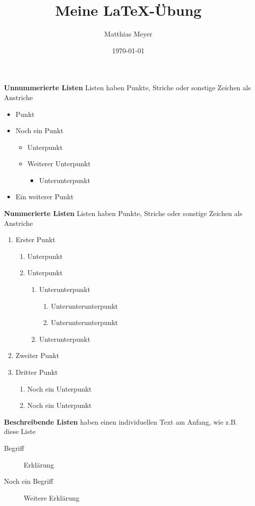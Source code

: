 \documentclass[a4paper,twoside,10pt]{article}
\author{Matthias Meyer}
\title{Meine LaTeX-Übung}
\date{\today}
\begin{document}
\textbf{Unnummerierte Listen} Listen haben Punkte, Striche oder sonstige Zeichen als Anstriche
 \begin{itemize}
    \item Punkt
    \item Noch ein Punkt
    \begin{itemize}
        \item Unterpunkt
        \item Weiterer Unterpunkt
        \begin{itemize}
            \item Unterunterpunkt
        \end{itemize}        
    \end{itemize}
    \item Ein weiterer Punkt
 \end{itemize}

 \textbf{Nummerierte Listen} Listen haben Punkte, Striche oder sonstige Zeichen als Anstriche

 \begin{enumerate}
     \item Erster Punkt
     \begin{enumerate}
         \item Unterpunkt
         \item Unterpunkt
         \begin{enumerate}
            \item Unterunterpunkt
            \begin{enumerate}
                \item Unterunterunterpunkt
                \item Unterunterunterpunkt
            \end{enumerate}
            \item Unterunterpunkt
         \end{enumerate}
     \end{enumerate}
     \item Zweiter Punkt
     \item Dritter Punkt
     \begin{enumerate}
         \item Noch ein Unterpunkt
         \item Noch ein Unterpunkt
     \end{enumerate}
 \end{enumerate}

 \textbf{Beschreibende Listen} haben einen individuellen Text am Anfang, wie z.B. diese Liste
 
 \begin{description}
     \item[Begriff] Erklärung
     \item[Noch ein Begriff] Weitere Erklärung 
 \end{description}
\end{document}
